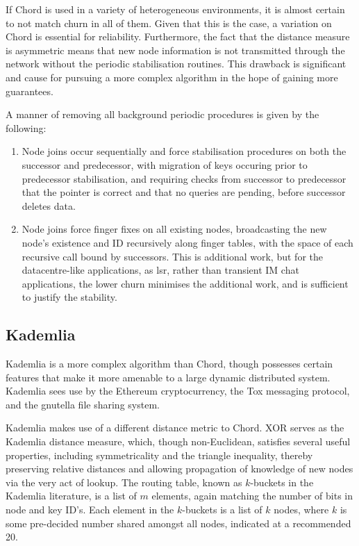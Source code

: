 \documentclass[10pt, a4paper]{article}
\begin{document}
If Chord is used in a variety of heterogeneous environments, it is almost certain to not match churn in all of them.
Given that this is the case, a variation on Chord is essential for reliability.
Furthermore, the fact that the distance measure is asymmetric means that new node information is not transmitted through the network without the periodic stabilisation routines.
This drawback is significant and cause for pursuing a more complex algorithm in the hope of gaining more guarantees.

A manner of removing all background periodic procedures is given by the following:
\begin{enumerate}
	\item Node joins occur sequentially and force stabilisation procedures on both the successor and predecessor, with migration of keys occuring prior to predecessor stabilisation, and requiring checks from successor to predecessor that the pointer is correct and that no queries are pending, before successor deletes data.
	\item Node joins force finger fixes on all existing nodes, broadcasting the new node's existence and ID recursively along finger tables, with the space of each recursive call bound by successors.
		This is additional work, but for the datacentre-like applications, as lsr{}, rather than transient IM chat applications, the lower churn minimises the additional work, and is sufficient to justify the stability.
\end{enumerate}

\subsection{Kademlia}

Kademlia is a more complex algorithm than Chord, though possesses certain features that make it more amenable to a large dynamic distributed system.
Kademlia sees use by the Ethereum cryptocurrency, the Tox messaging protocol, and the gnutella file sharing system.

Kademlia makes use of a different distance metric to Chord.
XOR serves as the Kademlia distance measure, which, though non-Euclidean, satisfies several useful properties, including symmetricality and the triangle inequality, thereby preserving relative distances and allowing propagation of knowledge of new nodes via the very act of lookup.
The routing table, known as $k$-buckets in the Kademlia literature, is a list of $m$ elements, again matching the number of bits in node and key ID's.
Each element in the $k$-buckets is a list of $k$ nodes, where $k$ is some pre-decided number shared amongst all nodes, indicated at a recommended 20.
\end{document}

